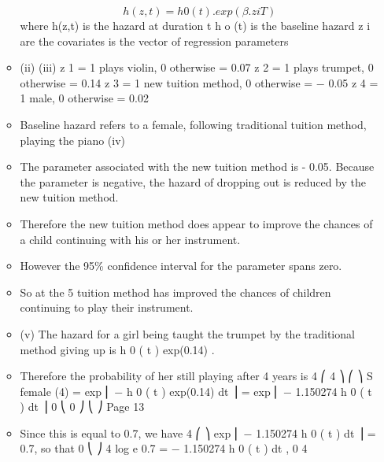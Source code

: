 \documentclass[a4paper,12pt]{article}
\begin{document}
\begin{enumerate}
\begin{itemize}
\[h ( z , t ) = h 0 ( t ).exp( \beta . z i T )\]
where h(z,t) is the hazard at duration t
h o (t) is the baseline hazard
z i are the covariates
\beta is the vector of regression parameters
\item (ii)
(iii)
z 1 = 1 plays violin, 0 otherwise  = 0.07
z 2 = 1 plays trumpet, 0 otherwise  = 0.14
z 3 = 1 new tuition method, 0 otherwise  = − 0.05
z 4 = 1 male, 0 otherwise  = 0.02
\item Baseline hazard refers to
a female,
following traditional tuition method,
playing the piano
(iv)
\item The parameter associated with the new tuition
method is - 0.05. Because the parameter is negative, the hazard of dropping
out is reduced by the new tuition method.
\item Therefore the new tuition method does appear
to improve the chances of a child continuing
with his or her instrument.
\item However the 95\% confidence interval for the parameter spans zero.
\item So at the 5%
tuition method has improved the chances of children continuing to play their
instrument.
\item (v)
The hazard for a girl being taught the trumpet by the traditional
method giving up is h 0 ( t ) exp(0.14) .
\item Therefore the probability of her still playing after 4 years is
4
⎛ 4
⎞
⎛
⎞
S female (4) = exp ⎜ − \int h 0 ( t ) exp(0.14) dt ⎟ = exp ⎜ − 1.150274 \int h 0 ( t ) dt ⎟
0
⎝ 0
⎠
⎝
⎠
Page 13%
\item Since this is equal to 0.7, we have
4
⎛
⎞
exp ⎜ − 1.150274 \int h 0 ( t ) dt ⎟ = 0.7, so that
0
⎝
⎠
4
log e 0.7 = − 1.150274 \int h 0 ( t ) dt ,
0
4
\end{itemize}


\end{enumerate}
\end{document}
